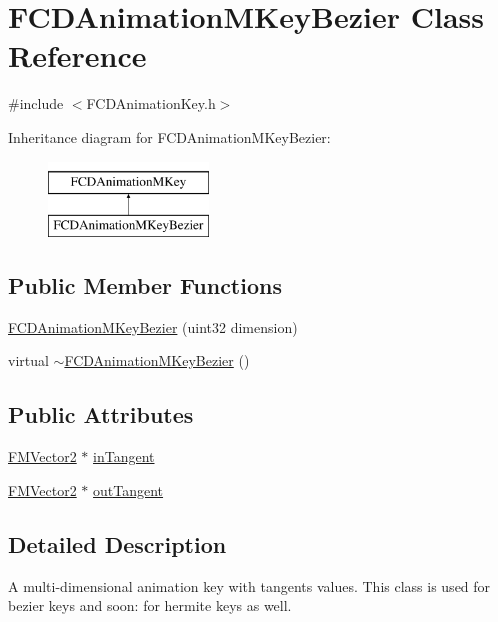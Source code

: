 \hypertarget{classFCDAnimationMKeyBezier}{
\section{FCDAnimationMKeyBezier Class Reference}
\label{classFCDAnimationMKeyBezier}
}


{\ttfamily \#include $<$FCDAnimationKey.h$>$}

Inheritance diagram for FCDAnimationMKeyBezier:\begin{figure}[H]
\begin{center}
\leavevmode
\includegraphics[height=2.000000cm]{classFCDAnimationMKeyBezier}
\end{center}
\end{figure}
\subsection*{Public Member Functions}
\begin{DoxyCompactItemize}
\item 
\hyperlink{classFCDAnimationMKeyBezier_a45aa55fc7430c817a8ab08882d2fcb9f}{FCDAnimationMKeyBezier} (uint32 dimension)
\item 
virtual \hyperlink{classFCDAnimationMKeyBezier_ae266c127ad7d936f2060b40c5368762f}{$\sim$FCDAnimationMKeyBezier} ()
\end{DoxyCompactItemize}
\subsection*{Public Attributes}
\begin{DoxyCompactItemize}
\item 
\hyperlink{classFMVector2}{FMVector2} $\ast$ \hyperlink{classFCDAnimationMKeyBezier_aaf6f55f43516c1bf38cef19ecbb8fe21}{inTangent}
\item 
\hyperlink{classFMVector2}{FMVector2} $\ast$ \hyperlink{classFCDAnimationMKeyBezier_aea9338c2e0d894e9d5e9a4dcf00928e6}{outTangent}
\end{DoxyCompactItemize}


\subsection{Detailed Description}
A multi-\/dimensional animation key with tangents values. This class is used for bezier keys and soon: for hermite keys as well. 

